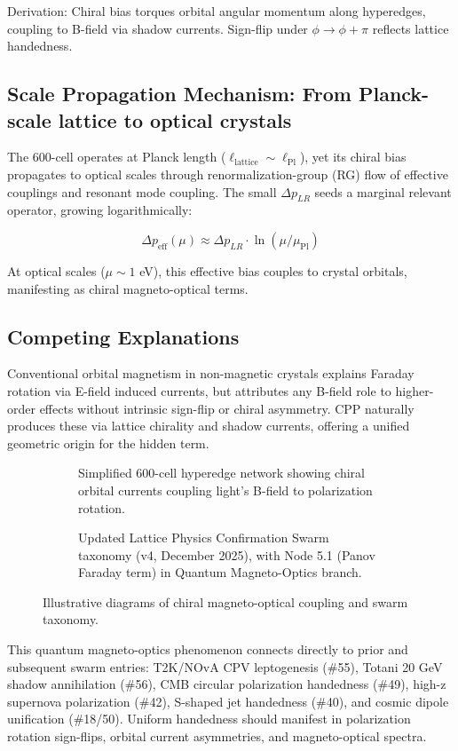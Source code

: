 \documentclass[11pt]{article}
\begin{document}
Derivation: Chiral bias torques orbital angular momentum along hyperedges, coupling to B-field via shadow currents. Sign-flip under $\phi \to \phi + \pi$ reflects lattice handedness.

\subsection{Scale Propagation Mechanism: From Planck-scale lattice to optical crystals}
The 600-cell operates at Planck length ($\ell_{\text{lattice}} \sim \ell_{\text{Pl}}$), yet its chiral bias propagates to optical scales through renormalization-group (RG) flow of effective couplings and resonant mode coupling. The small $\Delta p_{LR}$ seeds a marginal relevant operator, growing logarithmically:

\[
\Delta p_{\text{eff}}(\mu) \approx \Delta p_{LR} \cdot \ln(\mu / \mu_{\text{Pl}})
\]

At optical scales ($\mu \sim 1$ eV), this effective bias couples to crystal orbitals, manifesting as chiral magneto-optical terms.

\subsection{Competing Explanations}
Conventional orbital magnetism in non-magnetic crystals explains Faraday rotation via E-field induced currents, but attributes any B-field role to higher-order effects without intrinsic sign-flip or chiral asymmetry. CPP naturally produces these via lattice chirality and shadow currents, offering a unified geometric origin for the hidden term.

\begin{figure}[htbp]
\centering
\begin{subfigure}{0.45\textwidth}
\centering
\caption{Simplified 600-cell hyperedge network showing chiral orbital currents coupling light's B-field to polarization rotation.}
\label{fig:orbital-current}
\end{subfigure}
\hfill
\begin{subfigure}{0.45\textwidth}
\centering
\caption{Updated Lattice Physics Confirmation Swarm taxonomy (v4, December 2025), with Node 5.1 (Panov Faraday term) in Quantum Magneto-Optics branch.}
\label{fig:taxonomy-v4}
\end{subfigure}
\caption{Illustrative diagrams of chiral magneto-optical coupling and swarm taxonomy.}
\end{figure}

This quantum magneto-optics phenomenon connects directly to prior and subsequent swarm entries: T2K/NOvA CPV leptogenesis (\#55), Totani 20 GeV shadow annihilation (\#56), CMB circular polarization handedness (\#49), high-z supernova polarization (\#42), S-shaped jet handedness (\#40), and cosmic dipole unification (\#18/50). Uniform handedness should manifest in polarization rotation sign-flips, orbital current asymmetries, and magneto-optical spectra.
\end{document}
